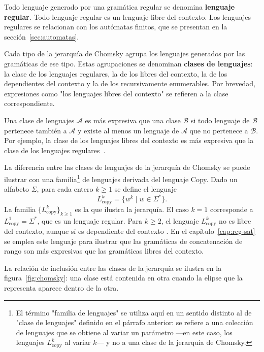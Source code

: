 \documentclass{report}
\theoremstyle{definition}
\theoremstyle{plain}
\theoremstyle{remark}
\begin{document}
Todo lenguaje generado por una gramática regular se denomina
\textbf{lenguaje regular}. Todo lenguaje regular es un lenguaje libre
del contexto. Los lenguajes regulares se relacionan con los autómatas
finitos, que se presentan en la sección~\ref{sec:automatas}.

Cada tipo de la jerarquía de Chomsky agrupa los lenguajes generados
por las gramáticas de ese tipo. Estas agrupaciones se denominan
\textbf{clases de lenguajes}: la clase de los lenguajes regulares, la
de los libres del contexto, la de los dependientes del contexto y la
de los recursivamente enumerables. Por brevedad, expresiones como "los
lenguajes libres del contexto" se refieren a la clase correspondiente.

Una clase de lenguajes $\mathcal{A}$ es más expresiva que una clase
$\mathcal{B}$ si todo lenguaje de $\mathcal{B}$ pertenece también a
$\mathcal{A}$ y existe al menos un lenguaje de $\mathcal{A}$ que no
pertenece a $\mathcal{B}$. Por ejemplo, la clase de los lenguajes
libres del contexto es más expresiva que la clase de los lenguajes
regulares~\cite{hopcroft2006introduction}.

La diferencia entre las clases de lenguajes de la jerarquía de Chomsky
se puede ilustrar con una familia\footnote{El término "familia de
lenguajes" se utiliza aquí en un sentido distinto al de "clase de
lenguajes" definido en el párrafo anterior: se refiere a una colección
de lenguajes que se obtiene al variar un parámetro ---en este caso,
los lenguajes $L_{\mathrm{copy}}^k$ al variar $k$--- y no a una clase
de la jerarquía de Chomsky.} de lenguajes derivada del lenguaje Copy.
Dado un alfabeto $\Sigma$, para cada entero $k \ge 1$ se define el
lenguaje
\[
  L_{\mathrm{copy}}^k = \{ w^k \mid w \in \Sigma^* \}.
\]
La familia $\{L_{\mathrm{copy}}^k\}_{k \ge 1}$ es la que ilustra la
jerarquía.
El caso $k = 1$ corresponde a $L_{\mathrm{copy}}^1 = \Sigma^*$, que es
un lenguaje regular. Para $k \ge 2$, el lenguaje $L_{\mathrm{copy}}^k$
no es libre del contexto, aunque sí es dependiente del contexto
\cite{hopcroft2006introduction}. En el capítulo~\ref{cap:rcg-sat} se
emplea este lenguaje para ilustrar que las gramáticas de concatenación
de rango son más expresivas que las gramáticas libres del contexto.

La relación de inclusión entre las clases de la jerarquía se ilustra
en la figura~\ref{fig:chomsky}: una clase está contenida en otra
cuando la elipse que la representa aparece dentro de la otra.
\end{document}
